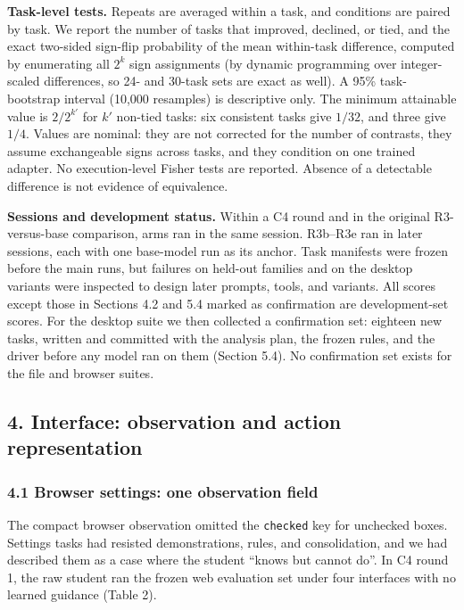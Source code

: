 \documentclass[
  10pt,
]{article}
\begin{document}
\textbf{Task-level tests.} Repeats are averaged within a task, and
conditions are paired by task. We report the number of tasks that
improved, declined, or tied, and the exact two-sided sign-flip
probability of the mean within-task difference, computed by enumerating
all \(2^k\) sign assignments (by dynamic programming over integer-scaled
differences, so 24- and 30-task sets are exact as well). A 95\%
task-bootstrap interval (10,000 resamples) is descriptive only. The
minimum attainable value is \(2/2^{k'}\) for \(k'\) non-tied tasks: six
consistent tasks give \(1/32\), and three give \(1/4\). Values are
nominal: they are not corrected for the number of contrasts, they assume
exchangeable signs across tasks, and they condition on one trained
adapter. No execution-level Fisher tests are reported. Absence of a
detectable difference is not evidence of equivalence.

\textbf{Sessions and development status.} Within a C4 round and in the
original R3-versus-base comparison, arms ran in the same session.
R3b--R3e ran in later sessions, each with one base-model run as its
anchor. Task manifests were frozen before the main runs, but failures on
held-out families and on the desktop variants were inspected to design
later prompts, tools, and variants. All scores except those in Sections
4.2 and 5.4 marked as confirmation are development-set scores. For the
desktop suite we then collected a confirmation set: eighteen new tasks,
written and committed with the analysis plan, the frozen rules, and the
driver before any model ran on them (Section 5.4). No confirmation set
exists for the file and browser suites.

\subsection{4. Interface: observation and action
representation}\label{interface-observation-and-action-representation}

\subsubsection{4.1 Browser settings: one observation
field}\label{browser-settings-one-observation-field}

The compact browser observation omitted the \texttt{checked} key for
unchecked boxes. Settings tasks had resisted demonstrations, rules, and
consolidation, and we had described them as a case where the student
``knows but cannot do''. In C4 round 1, the raw student ran the frozen
web evaluation set under four interfaces with no learned guidance (Table
2).
\end{document}
